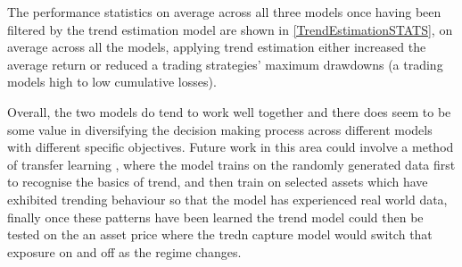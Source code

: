 \documentclass[11pt]{article}
\begin{document}
The performance statistics on average across all three models once having been filtered by the trend estimation model are shown in \ref{TrendEstimationSTATS}, on average across all the models, applying trend estimation either increased the average return or reduced a trading strategies' maximum drawdowns (a trading models high to low cumulative losses).

Overall, the two models do tend to work well together and there does seem to be some value in diversifying the decision making process across different models with different specific objectives. Future work in this area could involve a method of transfer learning , where the model trains on the randomly generated data first to recognise the basics of trend, and then train on selected assets which have exhibited trending behaviour so that the model has experienced real world data, finally once these patterns have been learned the trend model could then be tested on the an asset price where the tredn capture model would switch that exposure on and off as the regime changes. 
\clearpage
\end{document}
